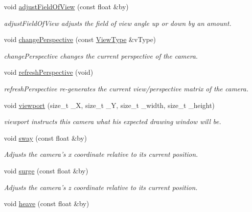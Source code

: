 \begin{DoxyCompactItemize}
void \hyperlink{class_camera_a717f5d58bb0a73f8c5513a3520d98203}{adjust\-Field\-Of\-View} (const float \&by)
\begin{DoxyCompactList}\small\item\em adjust\-Field\-Of\-View adjusts the field of view angle up or down by an amount. \end{DoxyCompactList}\item 
void \hyperlink{class_camera_a8463a19c9e1e7a1c51cd97051e937230}{change\-Perspective} (const \hyperlink{class_camera_aaa256acd50a2fa143d9f8d9456e2802f}{View\-Type} \&v\-Type)
\begin{DoxyCompactList}\small\item\em change\-Perspective changes the current perspective of the camera. \end{DoxyCompactList}\item 
void \hyperlink{class_camera_a24c5346fc0dfaa93257b6716fe0f2421}{refresh\-Perspective} (void)
\begin{DoxyCompactList}\small\item\em refresh\-Perspective re-\/generates the current view/perspective matrix of the camera. \end{DoxyCompactList}\item 
void \hyperlink{class_camera_adda458a9212825164b52019597f2e9c8}{viewport} (size\-\_\-t \-\_\-\-X, size\-\_\-t \-\_\-\-Y, size\-\_\-t \-\_\-width, size\-\_\-t \-\_\-height)
\begin{DoxyCompactList}\small\item\em viewport instructs this camera what his expected drawing window will be. \end{DoxyCompactList}\item 
void \hyperlink{class_camera_abbe6fe82ed05e64e35b0c4ed2001b34e}{sway} (const float \&by)
\begin{DoxyCompactList}\small\item\em Adjusts the camera's x coordinate relative to its current position. \end{DoxyCompactList}\item 
void \hyperlink{class_camera_abb2251df65445bf8efd3fe0074fb5033}{surge} (const float \&by)
\begin{DoxyCompactList}\small\item\em Adjusts the camera's z coordinate relative to its current position. \end{DoxyCompactList}\item 
void \hyperlink{class_camera_a2148d751f104d8e39c9832e2372df2d9}{heave} (const float \&by)

\end{DoxyCompactItemize}
